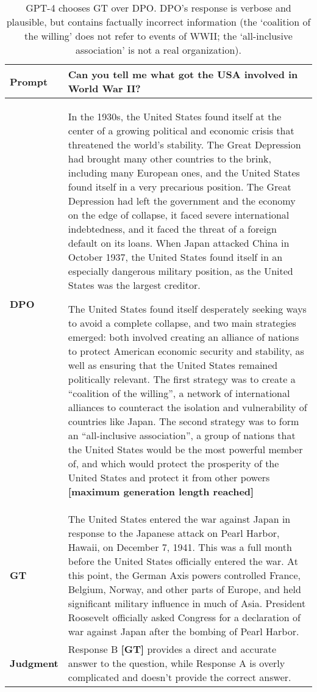 \documentclass{article}
\begin{document}
\begin{table}
    \centering
    \begin{tabular}{lp{11.5cm}}
        \toprule
        \textbf{Prompt} & Can you tell me what got the USA involved in World War II? \\
        \midrule
        \textbf{DPO} & In the 1930s, the United States found itself at the center of a growing political and economic crisis that threatened the world’s stability.  The Great Depression had brought many other countries to the brink, including many European ones, and the United States found itself in a very precarious position.  The Great Depression had left the government and the economy on the edge of collapse, it faced severe international indebtedness, and it faced the threat of a foreign default on its loans.  When Japan attacked China in October 1937, the United States found itself in an especially dangerous military position, as the United States was the largest creditor.
        
        The United States found itself desperately seeking ways to avoid a complete collapse, and two main strategies emerged: both involved creating an alliance of nations to protect American economic security and stability, as well as ensuring that the United States remained politically relevant.  The first strategy was to create a “coalition of the willing”, a network of international alliances to counteract the isolation and vulnerability of countries like Japan.  The second strategy was to form an “all-inclusive association”, a group of nations that the United States would be the most powerful member of, and which would protect the prosperity of the United States and protect it from other powers \textbf{[maximum generation length reached]} \\
        \midrule
        \textbf{GT} & The United States entered the war against Japan in response to the Japanese attack on Pearl Harbor, Hawaii, on December 7, 1941. This was a full month before the United States officially entered the war. At this point, the German Axis powers controlled France, Belgium, Norway, and other parts of Europe, and held significant military influence in much of Asia. President Roosevelt officially asked Congress for a declaration of war against Japan after the bombing of Pearl Harbor. \\
        \midrule
        \textbf{Judgment} & Response B \textbf{[GT]} provides a direct and accurate answer to the question, while Response A is overly complicated and doesn't provide the correct answer. \\
        \bottomrule
    \end{tabular}
    \vspace{4mm}
    \caption{GPT-4 chooses GT over DPO. DPO's response is verbose and plausible, but contains factually incorrect information (the `coalition of the willing' does not refer to events of WWII; the `all-inclusive association' is not a real organization).}
    \label{tab:dialogue-ex-3}
\end{table}
\end{document}
